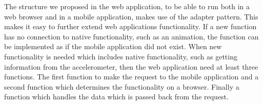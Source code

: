 The structure we proposed in the web application, to be able to run both in a web browser and in a mobile application, makes use of the adapter pattern. This makes it easy to further extend web applications functionality. If a new function has no connection to native functionality, such as an animation, the function can be implemented as if the mobile application did not exist. When new functionality is needed which includes native functionality, such as getting information from the accelerometer, then the web application need at least three functions. The first function to make the request to the mobile application and a second function which determines the functionality on a browser. Finally a function which handles the data which is passed back from the request. 
